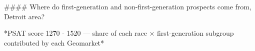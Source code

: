 #### Where do first-generation and non-first-generation prospects come from, Detroit area?

*PSAT score 1270 - 1520 — share of each race × first-generation subgroup contributed by each Geomarket*
